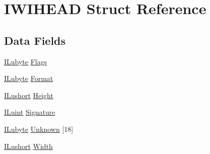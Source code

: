 \hypertarget{struct_i_w_i_h_e_a_d}{\section{I\-W\-I\-H\-E\-A\-D Struct Reference}
\label{struct_i_w_i_h_e_a_d}
}
\subsection*{Data Fields}
\begin{DoxyCompactItemize}
\item 
\hyperlink{il_8h_a8d2f04500100a86d1b00e98ab1b15a33}{I\-Lubyte} \hyperlink{struct_i_w_i_h_e_a_d_a4d4e57f611ec63d5199ee6ea1c56077e}{Flags}
\item 
\hyperlink{il_8h_a8d2f04500100a86d1b00e98ab1b15a33}{I\-Lubyte} \hyperlink{struct_i_w_i_h_e_a_d_aa93a325ca30831f723f4a537174fc6e5}{Format}
\item 
\hyperlink{il_8h_af6287b43748354a7c4864da43ae56962}{I\-Lushort} \hyperlink{struct_i_w_i_h_e_a_d_ab74e2bb7cc7272180be796817440ae4e}{Height}
\item 
\hyperlink{il_8h_ac6508d0e9c19e32f32e00d54b5b8cf30}{I\-Luint} \hyperlink{struct_i_w_i_h_e_a_d_a41fa9091b239c168dd116f1c2cd99256}{Signature}
\item 
\hyperlink{il_8h_a8d2f04500100a86d1b00e98ab1b15a33}{I\-Lubyte} \hyperlink{struct_i_w_i_h_e_a_d_afacd5863b8a527624c9b80812c1538aa}{Unknown} \mbox{[}18\mbox{]}
\item 
\hyperlink{il_8h_af6287b43748354a7c4864da43ae56962}{I\-Lushort} \hyperlink{struct_i_w_i_h_e_a_d_aed0f0a923b8346ba51a4de45fff77ee7}{Width}
\end{DoxyCompactItemize}


